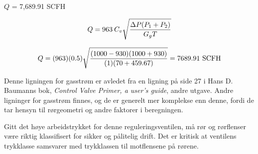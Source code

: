 





$Q$ = 7,689.91 SCFH
 






$$Q = 963 \> C_v \sqrt{{\Delta P (P_1 + P_2)} \over {G_g T}}$$

$$Q = (963) (0.5) \sqrt{{(1000 - 930) (1000 + 930)} \over {(1) (70 +459.67)}} = 7689.91 \hbox{ SCFH}$$

\vskip 10pt

Denne ligningen for gasstrøm er avledet fra en ligning på side 27 i Hans D. Baumanns bok, {\it Control Valve Primer, a user's guide}, andre utgave. Andre ligninger for gasstrøm finnes, og de er generelt mer komplekse enn denne, fordi de tar hensyn til rørgeometri og andre faktorer i beregningen.

\vskip 10pt

Gitt det høye arbeidstrykket for denne reguleringsventilen, må rør og rørflenser være riktig klassifisert for sikker og pålitelig drift. Det er kritisk at ventilens trykklasse samsvarer med trykklassen til motflensene på rørene.



